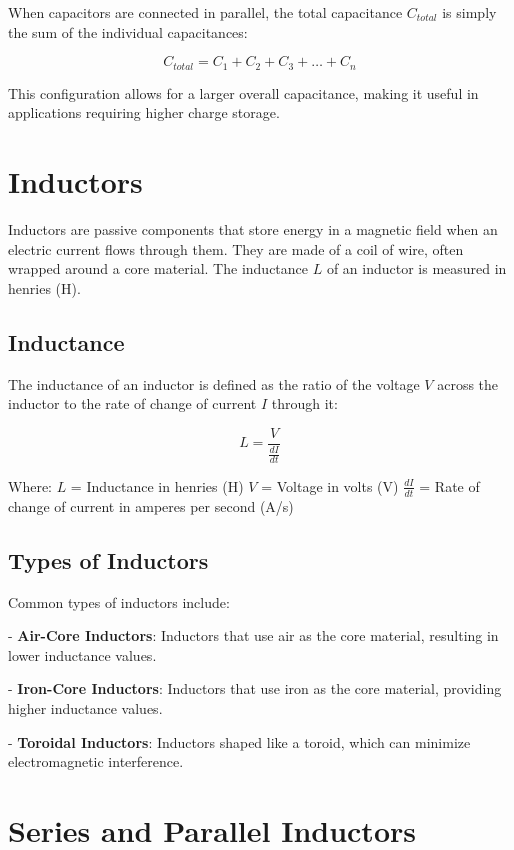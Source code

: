\documentclass[openany]{book}
\begin{document}
When capacitors are connected in parallel, the total capacitance \(C_{total}\) is simply the sum of the individual capacitances:

\[
C_{total} = C_1 + C_2 + C_3 + \ldots + C_n
\]

This configuration allows for a larger overall capacitance, making it useful in applications requiring higher charge storage.

\section{Inductors}

Inductors are passive components that store energy in a magnetic field when an electric current flows through them. They are made of a coil of wire, often wrapped around a core material. The inductance \(L\) of an inductor is measured in henries (H).

\subsection{Inductance}

The inductance of an inductor is defined as the ratio of the voltage \(V\) across the inductor to the rate of change of current \(I\) through it:

\[
L = \frac{V}{\frac{dI}{dt}}
\]

Where:
 \(L\) = Inductance in henries (H)
 \(V\) = Voltage in volts (V)
 \(\frac{dI}{dt}\) = Rate of change of current in amperes per second (A/s)

\subsection{Types of Inductors}

Common types of inductors include:

- \textbf{Air-Core Inductors}: Inductors that use air as the core material, resulting in lower inductance values.

- \textbf{Iron-Core Inductors}: Inductors that use iron as the core material, providing higher inductance values.

- \textbf{Toroidal Inductors}: Inductors shaped like a toroid, which can minimize electromagnetic interference.

\section{Series and Parallel Inductors}
\end{document}
